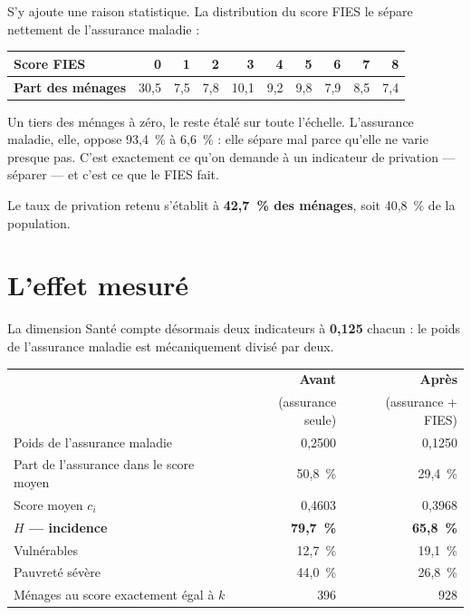 \documentclass[11pt,a4paper]{article}
\begin{document}
S'y ajoute une raison statistique. La distribution du score FIES le sépare nettement de
l'assurance maladie :

\begin{center}
\small
\begin{tabular}{@{}lrrrrrrrrr@{}}
\toprule
\textbf{Score FIES} & 0 & 1 & 2 & 3 & 4 & 5 & 6 & 7 & 8 \\
\midrule
\textbf{Part des ménages} & 30,5 & 7,5 & 7,8 & 10,1 & 9,2 & 9,8 & 7,9 & 8,5 & 7,4 \\
\bottomrule
\end{tabular}
\end{center}

Un tiers des ménages à zéro, le reste étalé sur toute l'échelle. L'assurance maladie, elle, oppose
93,4~\% à 6,6~\% : elle sépare mal parce qu'elle ne varie presque pas. C'est exactement ce qu'on
demande à un indicateur de privation --- séparer --- et c'est ce que le FIES fait.

Le taux de privation retenu s'établit à \textbf{42,7~\% des ménages}, soit 40,8~\% de la
population.

\section{L'effet mesuré}

La dimension Santé compte désormais deux indicateurs à \textbf{0,125} chacun : le poids de
l'assurance maladie est mécaniquement divisé par deux.

\begin{center}
\begin{tabular}{@{}lrr@{}}
\toprule
& \textbf{Avant} & \textbf{Après} \\
& \small(assurance seule) & \small(assurance + FIES) \\
\midrule
Poids de l'assurance maladie & 0,2500 & 0,1250 \\
Part de l'assurance dans le score moyen & 50,8~\% & 29,4~\% \\
Score moyen $c_i$ & 0,4603 & 0,3968 \\
\textbf{$H$ --- incidence} & \textbf{79,7~\%} & \textbf{65,8~\%} \\
Vulnérables & 12,7~\% & 19,1~\% \\
Pauvreté sévère & 44,0~\% & 26,8~\% \\
Ménages au score exactement égal à $k$ & 396 & 928 \\
\bottomrule
\end{tabular}
\end{center}
\end{document}
